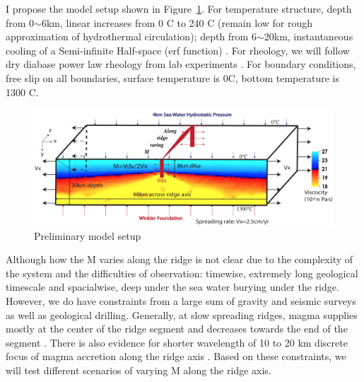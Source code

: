 \documentclass[12pt]{article}
\begin{document}
I propose the model setup shown in Figure~\ref{fig8_1}. For temperature structure, depth from 0$\sim$6km, linear increases from 0 \degree C to 240 \degree C (remain low for rough approximation of hydrothermal circulation); depth from 6$\sim$20km, instantaneous cooling of a Semi-infinite Half-space (erf function) \citep{Turcotte2002}. For rheology, we will follow dry diabase power law rheology from lab experiments \citep{Kirby1987}. For boundary conditions, free slip on all boundaries, surface temperature is 0\degree C, bottom temperature is 1300 \degree C.

\begin{figure}[H]
 \centering
  \includegraphics[scale=0.5]{fig8_1.png}
 \caption{\small Preliminary model setup}
 \label{fig8_1}
\end{figure}


Although how the M varies along the ridge is not clear due to the complexity of the system and the difficulties of observation: timewise, extremely long geological timescale and spacialwise, deep under the sea water burying under the ridge. However, we do have constraints from a large sum of gravity and seismic surveys as well as geological drilling. Generally, at slow spreading ridges, magma supplies mostly at the center of the ridge segment and decreases towards the end of the segment \citep{Tolstoy1993,Chen1999}. There is also evidence for shorter wavelength of 10 to 20 km discrete focus of magma accretion along the ridge axis \citep{Lin1990}. Based on these constraints, we will test different scenarios of varying M along the ridge axis. 

\end{document}
